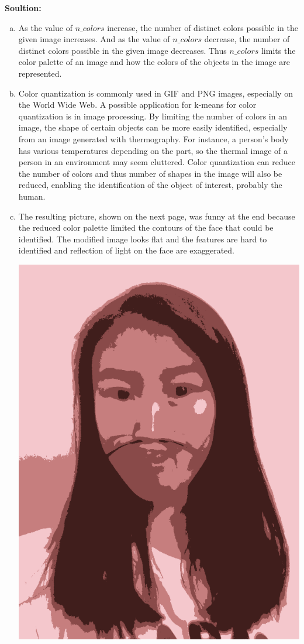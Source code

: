 \documentclass[a4paper]{article}
\begin{document}
\begin {description}
\smallskip
\textbf{Soultion:}
\begin{doublespace}
\begin{enumerate}[(e) i.]
\item As the value of $n\_colors$ increase, the number of distinct colors possible in the given image increases. And as the value of $n\_colors$ decrease, the number of distinct colors possible in the given image decreases. Thus $n\_colors$ limits the color palette of an image and how the colors of the objects in the image are represented.
\item Color quantization is commonly used in GIF and PNG images, especially on the World Wide Web. A possible application for k-means for color quantization is in image processing. By limiting the number of colors in an image, the shape of certain objects can be more easily identified, especially from an image generated with thermography. For instance, a person's body has various temperatures depending on the part, so the thermal image of a person in an environment may seem cluttered. Color quantization can reduce the number of colors and thus number of shapes in the image will also be reduced, enabling the identification of the object of interest, probably the human.
\item The resulting picture, shown on the next page, was funny at the end because the reduced color palette limited the contours of the face that could be identified. The modified image looks flat and the features are hard to identified and reflection of light on the face are exaggerated.
\begin{center}
\includegraphics[scale=0.65]{funnyme.png}

\end{center}
\end{enumerate}
\end{doublespace}
\end{description}
\end{document}
